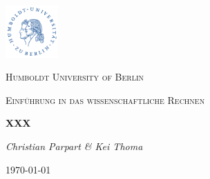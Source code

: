 \begin{titlepage}
	\centering
	\includegraphics[width=0.15\textwidth]{images/huberlin_logo}\par\vspace{1cm}
	{\scshape\LARGE Humboldt University of Berlin \par}
	\vspace{1cm}
	{\scshape\Large Einf{\"u}hrung in das wissenschaftliche Rechnen \par}
	\vspace{1.5cm}
	{\huge\bfseries XXX\par}
	\vspace{2cm}
	{\Large\itshape Christian Parpart \& Kei Thoma \par}
	\vfill

	\vfill

	{\large \today\par}
\end{titlepage}

\tableofcontents